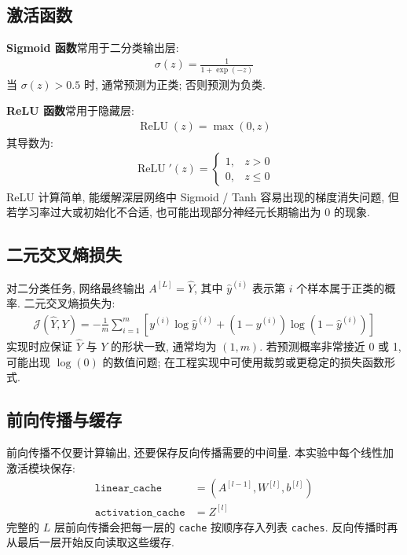 \documentclass{../../nndlcourse}
\begin{document}
\subsection{激活函数}

\textbf{Sigmoid 函数}常用于二分类输出层:
\begin{align}
    \sigma(z) = \frac{1}{1+\exp(-z)}
\end{align}
当 $\sigma(z)>0.5$ 时, 通常预测为正类; 否则预测为负类.

\textbf{ReLU 函数}常用于隐藏层:
\begin{align}
    \operatorname{ReLU}(z) = \max(0,z)
\end{align}
其导数为:
\begin{align}
    \operatorname{ReLU}'(z) =
    \begin{cases}
        1, & z>0 \\
        0, & z\le 0
    \end{cases}
\end{align}
ReLU 计算简单, 能缓解深层网络中 Sigmoid / Tanh 容易出现的梯度消失问题, 但若学习率过大或初始化不合适, 也可能出现部分神经元长期输出为 0 的现象.

\subsection{二元交叉熵损失}

对二分类任务, 网络最终输出 $A^{[L]}=\hat{Y}$, 其中 $\hat{y}^{(i)}$ 表示第 $i$ 个样本属于正类的概率. 二元交叉熵损失为:
\begin{align}
    \mathcal{J}(\hat{Y},Y)
    = -\frac{1}{m}\sum_{i=1}^{m}
    \left[
        y^{(i)}\log \hat{y}^{(i)}
        + \left(1-y^{(i)}\right)\log\left(1-\hat{y}^{(i)}\right)
    \right]
\end{align}
实现时应保证 $\hat{Y}$ 与 $Y$ 的形状一致, 通常均为 $(1,m)$. 若预测概率非常接近 0 或 1, 可能出现 $\log(0)$ 的数值问题; 在工程实现中可使用裁剪或更稳定的损失函数形式.

\subsection{前向传播与缓存}

前向传播不仅要计算输出, 还要保存反向传播需要的中间量. 本实验中每个线性加激活模块保存:
\begin{align}
    \texttt{linear\_cache} &= (A^{[l-1]}, W^{[l]}, b^{[l]}) \\
    \texttt{activation\_cache} &= Z^{[l]}
\end{align}
完整的 $L$ 层前向传播会把每一层的 \texttt{cache} 按顺序存入列表 \texttt{caches}. 反向传播时再从最后一层开始反向读取这些缓存.
\end{document}
